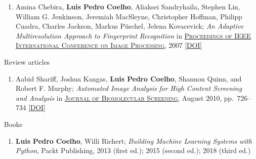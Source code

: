\documentclass{article}
\renewcommand\subsection[1]{%
    \par\vspace{.1em}%
    {\hspace{0em}\subsubhead #1}%
    \par\vspace{.4em}%
}
\renewcommand\subsubsection[1]{%
    \par\vspace{.1em}%
    {\hspace{1em}\subsubsubhead #1}%
    \par\vspace{.2em}%
}
\newcommand\showdoi[1]{%
    \href{http://dx.doi.org/#1}{[DOI]}%
}
\newcommand\pubname[1]{\textsc{\uline{#1}}}
\newcommand\contribution[1]{\relax}
\begin{document}
\begin{enumerate}[resume]
\item Amina Chebira, \textbf{Luis Pedro Coelho}, Aliaksei Sandryhaila, Stephen
Lin, William G. Jenkinson, Jeremiah MacSleyne, Christopher Hoffman, Philipp
Cuadra, Charles Jackson, Markus Püschel, Jelena Kovacevick; \emph{An Adaptive
Multiresolution Approach to Fingerprint Recognition} in \pubname{Proceedings of
IEEE International Conference on Image Processing}, 2007
\showdoi{10.1109/ICIP.2007.4378990}
\contribution{I developed and implemented one of the methods presented in the
paper.}

\end{enumerate}

\subsubsection{Review articles}
\begin{enumerate}[resume]

\item Aabid Shariff, Joshua Kangas, \textbf{Luis Pedro Coelho}, Shannon Quinn,
and Robert F. Murphy; \emph{Automated Image Analysis for High Content Screening
and Analysis} in \pubname{Journal of Biomolecular Screening}, August 2010, pp.\
726--734 \showdoi{10.1177/1087057110370894}
\end{enumerate}

\subsection{Books}
\begin{enumerate}
\item \textbf{Luis Pedro Coelho}, Willi Richert; \emph{Building Machine
Learning Systems with Python}, Packt Publishing, 2013 (first ed.); 2015
(second ed.); 2018 (third ed.)
\end{enumerate}

\break
\end{document}
